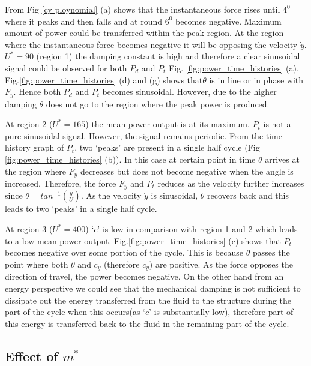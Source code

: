 From Fig \ref{cy ploynomial} (a) shows that the instantaneous force rises until $4^0$ where it peaks and then falls and at round $6^0$ becomes negative. Maximum amount of power could be transferred within the peak region. At the region where the instantaneous force becomes negative it will be opposing the velocity $\dot{y}$. $U^*=90$ (region 1) the damping constant is high and therefore a clear sinusoidal signal could be observed for both $P_d$ and $P_t$ Fig. \ref{fig:power_time_histories} (a). Fig.\ref{fig:power_time_histories} (d) and (g) shows that$\theta$ is in line or in phase with $F_y$. Hence both $P_d$ and $P_t$ becomes sinusoidal. However, due to the higher damping  $\theta$ does not go to the region where the peak power is produced. 

At region 2 ($U^*=165$) the mean power output is at its maximum. $P_t$ is not a pure sinusoidal signal. However, the  signal remains periodic. From the time history graph of $P_t$, two `peaks' are present in a single half cycle (Fig \ref{fig:power_time_histories} (b)). In this case at certain point in time $\theta$ arrives at the region where $F_y$ decreases but does not become negative when the angle is increased. Therefore, the force $F_y$ and $P_t$ reduces as the velocity further increases since $\theta = tan^{-1}(\frac{\dot{y}}{U})$. As the velocity $\dot{y}$ is sinusoidal, $\theta$ recovers back and this leads to two `peaks'  in a single half cycle.

 At region 3 ($U^*= 400$) `$c$' is low in comparison with region 1 and 2 which leads to a low mean power output. Fig.\ref{fig:power_time_histories} (c) shows that $P_t$ becomes negative over some portion of the cycle. This is because $\theta$  passes the point where both $\theta$ and $c_y$ (therefore $c_y$) are positive. As the force opposes the direction of travel, the power becomes negative. On the other hand from an energy perspective we could see that the mechanical damping is not sufficient to dissipate out the energy transferred from the fluid to the structure during the part of the cycle when this occurs(as `$c$' is substantially low), therefore  part of this energy is transferred back to the fluid in the remaining part of the cycle.

 
  

 



\subsection{Effect of $m^*$}

